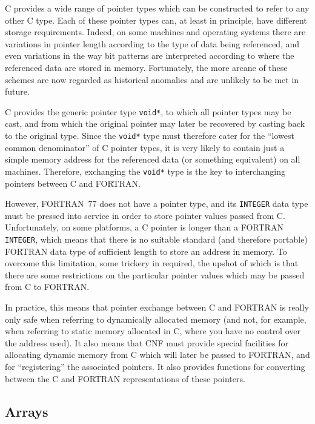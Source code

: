 \documentclass[twoside,11pt]{article}
\newcommand{\xlabel}[1]{}
\renewcommand{\_}{\texttt{\symbol{95}}}
\begin{document}
C provides a wide range of pointer types which can be constructed to
refer to any other C type. Each of these pointer types can, at least
in principle, have different storage requirements. Indeed, on some
machines and operating systems there are variations in pointer length
according to the type of data being referenced, and even variations in
the way bit patterns are interpreted according to where the referenced
data are stored in memory. Fortunately, the more arcane of these
schemes are now regarded as historical anomalies and are unlikely to
be met in future.

C provides the generic pointer type \texttt{void*}, to which all
pointer types may be cast, and from which the original pointer may
later be recovered by casting back to the original type. Since the
\texttt{void*} type must therefore cater for the ``lowest common
denominator'' of C pointer types, it is very likely to contain just a
simple memory address for the referenced data (or something
equivalent) on all machines. Therefore, exchanging the \texttt{void*}
type is the key to interchanging pointers between C and FORTRAN.

However, FORTRAN~77 does not have a pointer type, and its
\texttt{INTEGER} data type must be pressed into service in order to
store pointer values passed from C. Unfortunately, on some platforms,
a C pointer is longer than a FORTRAN \texttt{INTEGER}, which means
that there is no suitable standard (and therefore portable) FORTRAN
data type of sufficient length to store an address in memory. To
overcome this limitation, some trickery in required, the upshot of
which is that there are some restrictions on the particular pointer
values which may be passed from C to FORTRAN.

In practice, this means that pointer exchange between C and FORTRAN is
really only safe when referring to dynamically allocated memory (and
not, for example, when referring to static memory allocated in C,
where you have no control over the address used). It also means that
CNF must provide special facilities for allocating dynamic memory from
C which will later be passed to FORTRAN, and for ``registering'' the
associated pointers. It also provides functions for converting between
the C and FORTRAN representations of these pointers.

\subsection{\xlabel{arrays}Arrays}
\end{document}
